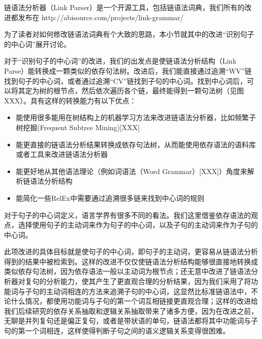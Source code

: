 链语法分析器（Link Parser）是一个开源工具，包括链语法词典，我们所有的改进都发布在 http://abisource.com/projects/link-grammar/

为了读者对如何修改链语法词典有个大致的思路，本小节就其中的改进“识别句子的中心词”展开讨论。

对于“识别句子的中心词”的改进，我们的出发点是使链语法分析结构（Link Parse）能转换成一颗类似的依存句法树。改进后，我们能直接通过追溯“WV”链找到句子的中心词，或者通过追溯“CV”链找到子句的中心词。找到中心词后，可以将其定为树的根节点，然后依次遍历各个链，最终能得到一颗句法树（见图XXX）。具有这样的转换能力有以下优点：
\begin{itemize}
\item 能使用很多能用在树结构上的机器学习方法来改进链语法分析器，比如频繁子树挖掘(Frequent Subtree Mining)[XXX]
\item 能更直接的链语法分析结果转换成依存句法树，从而能使用依存语法的语料库或者工具来改进链语法分析器
\item 能更好地从其他语法理论（例如词语法（Word Grammar）[XXX]）角度来解析链语法分析结构
\item 能简化一些RelEx中需要通过追溯很多链来找到中心词的规则
\end{itemize}

对于句子的中心词定义，语言学界有很多不同的看法。我们这里借鉴依存语法的观点，选择使用句子的主动词来作为句子的中心词，以及子句的主动词来作为子句的中心词。

此项改进的具体目标就是使句子的中心词，即句子的主动词，更容易从链语法分析得到的结果中被检索到。这样的改进不仅仅使链语法分析结构能够很直接地转换成类似依存句法树，因为依存语法一般以主动词为根节点；还无意中改进了链语法分析器对复句的分析能力，使其产生了更直观合理的分析结果，因为我们采用了将功能词与子句的主动词相连的方法来追溯子句的中心词，这显然比标准链语法中，不论什么情况，都使用功能词与子句的第一个词互相链接更直观合理；这样的改进给我们后续研究的依存关系抽取和逻辑关系抽取带来了诸多方便，因为在改进之前，无聊是并列复句还是偏正复句，或者是带状语的单句，链语法都将其中功能词与子句的第一个词相连，这样使得判断子句之间的语义逻辑关系变得很困难。

